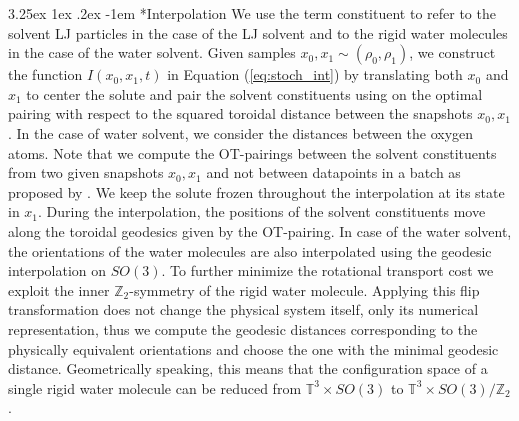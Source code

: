 \documentclass[%
onecolumn,
superscriptaddress,
nofootinbib,
amsmath,amssymb,
table
]{revtex4-2}
\makeatletter
\renewcommand\paragraph{%
  \@startsection{paragraph}{4}{\z@}%
    {3.25ex \@plus1ex \@minus.2ex}%
    {-1em}%
    {\normalfont\normalsize\bfseries}%
}
\makeatother
\begin{document}
\paragraph*{Interpolation}
We use the term constituent to refer to the solvent LJ particles in the case of the LJ solvent and to the rigid water molecules in the case of the water solvent. Given samples $x_0,x_1 \sim (\rho_0,\rho_1)$, we construct the function $I(x_0,x_1,t)$ in Equation (\ref{eq:stoch_int}) by  translating both $x_0$ and $x_1$ to center the solute and pair the solvent constituents using on the optimal pairing  with respect to the squared toroidal distance between the snapshots $x_0,x_1$.  In the case of water solvent, we consider the distances between the oxygen atoms.  Note that we compute the OT-pairings between the solvent constituents from two given snapshots $x_0,x_1$ and not between datapoints in a batch as proposed by \cite{tong_conditional_2023}. We keep the solute frozen throughout the interpolation at its state in $x_1$. During the interpolation, the positions of the solvent constituents move along the toroidal geodesics given by the OT-pairing. In case of the water solvent, the orientations of the water molecules are also interpolated using the geodesic interpolation on $SO(3)$. To further minimize the rotational transport cost we exploit the inner $\mathbb Z_2$-symmetry of the rigid water molecule. Applying this flip transformation does not change the physical system itself, only its numerical representation,  thus we compute the geodesic distances corresponding to the physically equivalent orientations and choose the one with the minimal geodesic distance. Geometrically speaking, this means that the configuration space of a single rigid water molecule can be reduced from $\mathbb T^3 \times SO(3)$ to $\mathbb T^3 \times SO(3)/\mathbb Z_2$.
\end{document}
